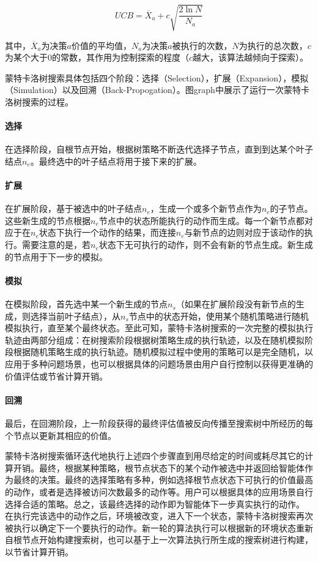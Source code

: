 \begin{equation}
UCB = \overline{X}_{a} + c\sqrt{\frac{2\ln N}{N_a}}
\end{equation}

其中，$\overline{X}_{a}$为决策$a$价值的平均值，$N_a$为决策$a$被执行的次数，$N$为执行的总次数，$c$为某个大于0的常数，其作用为控制探索的程度（$c$越大，该算法越倾向于探索）。

蒙特卡洛树搜索具体包括四个阶段：选择（Selection），扩展（Expansion），模拟（Simulation）以及回溯（Back-Propogation）。图graph中展示了运行一次蒙特卡洛树搜索的过程。

\paragraph{选择}
在选择阶段，自根节点开始，根据树策略不断迭代选择子节点，直到到达某个叶子结点$n_e$。最终选中的叶子结点将用于接下来的扩展。
\paragraph{扩展}
在扩展阶段，基于被选中的叶子结点$n_e$，生成一个或多个新节点作为$n_e$的子节点。这些新生成的节点根据$n_e$节点中的状态所能执行的动作而生成。每一个新节点都对应于在$n_e$状态下执行一个动作的结果，而连接$n_e$与新节点的边则对应于该动作的执行。需要注意的是，若$n_e$状态下无可执行的动作，则不会有新的节点生成。新生成的节点用于下一步的模拟。
\paragraph{模拟}
在模拟阶段，首先选中某一个新生成的节点$n_s$（如果在扩展阶段没有新节点的生成，则选择当前叶子结点），从$n_s$节点中的状态开始，使用某个随机策略进行随机模拟执行，直至某个最终状态。至此可知，蒙特卡洛树搜索的一次完整的模拟执行轨迹由两部分组成：在树搜索阶段根据树策略生成的执行轨迹，以及在随机模拟阶段根据随机策略生成的执行轨迹。随机模拟过程中使用的策略可以是完全随机，以应用于多种问题场景，也可以根据具体的问题场景由用户自行控制以获得更准确的价值评估或节省计算开销。
\paragraph{回溯}
最后，在回溯阶段，上一阶段获得的最终评估值被反向传播至搜索树中所经历的每个节点以更新其相应的价值。

蒙特卡洛树搜索循环迭代地执行上述四个步骤直到用尽给定的时间或耗尽其它的计算开销。最终，根据某种策略，根节点状态下的某个动作被选中并返回给智能体作为最终的决策。最终的选择策略有多种，例如选择根节点状态下可执行的价值最高的动作，或者是选择被访问次数最多的动作等。用户可以根据具体的应用场景自行选择合适的策略。总之，该最终选择的动作即为智能体下一步真实执行的动作。
%
在执行完该选中的动作之后，环境被改变，进入下一个状态，蒙特卡洛树搜索再次被执行以确定下一个要执行的动作。新一轮的算法执行可以根据新的环境状态重新自根节点开始构建搜索树，也可以基于上一次算法执行所生成的搜索树进行构建，以节省计算开销。

